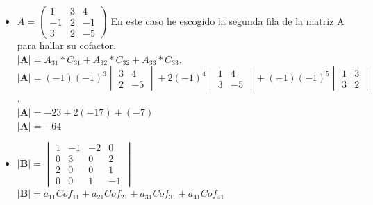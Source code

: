 \documentclass[stu, 12pt, letterpaper, donotrepeattitle, floatsintext, natbib]{apa7}
\begin{document}
    \begin{itemize}
        \item $
        A= \begin{pmatrix}
               1 & 3 & 4 \\ -1 & 2 & -1 \\ 3 & 2 & -5
        \end{pmatrix}
        $
        \vspace{0.5cm}
        En este caso he escogido la segunda fila de la matriz A para hallar su cofactor.\\
        $\textbf{|A|} = A_{31}*C_{31} + A_{32}*C_{32} + A_{33}*C_{33}$.\\[0.5cm]
        $\textbf{|A|} =
        (-1)(-1)^3 \begin{vmatrix}
                       3 & 4 \\ 2 & -5
        \end{vmatrix}
        +
        2(-1)^4 \begin{vmatrix}
                    1 & 4 \\ 3 & -5
        \end{vmatrix}
        +
        (-1)(-1)^5\begin{vmatrix}
                      1 & 3 \\ 3 & 2
        \end{vmatrix}
        $.\\[0.5cm]
        $\textbf{|A|} = -23 + 2(-17) + (-7)$\\
        $\textbf{|A|}=-64$\\[1cm]

        \newpage

        \item $
        \textbf{|B|}= \begin{vmatrix}
                          1 & -1 & -2 & 0  \\
                          0 & 3  & 0  & 2  \\
                          2 & 0  & 0  & 1  \\
                          0 & 0  & 1  & -1
        \end{vmatrix}
        $\\[0.5cm]
        $\textbf{|B|}=a_{11}{Cof}_{11} + a_{21}{Cof}_{21} + a_{31}{Cof}_{31} + a_{41}{Cof}_{41}$\\[0.5cm]


\end{itemize}
\end{document}
